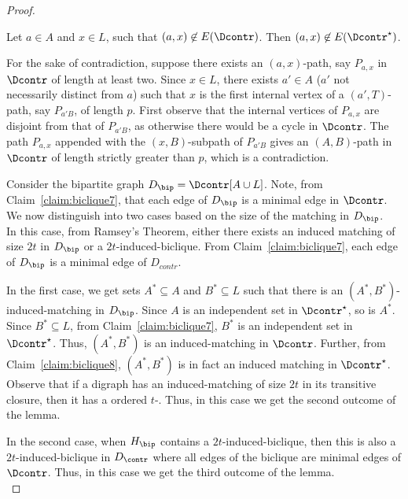 \begin{proof}
\begin{claim}\label{claim:biclique8}
Let $a \in A$ and $x \in L$, such that $(a,x) \not \in E(\Dcontr)$. Then $(a,x) \not \in E(\Dcontr^{\star})$.
\end{claim}

\begin{claimproof}
For the sake of contradiction, suppose there exists an $(a,x)$-path, say $P_{a,x}$ in $\Dcontr$ of length at least two. Since $x \in L$, there exists $a' \in A$ ($a'$ not necessarily distinct from $a$) such that $x$ is the first internal vertex of a $(a',T)$-path, say $P_{a'B}$, of length $p$. First observe that the internal vertices of $P_{a,x}$ are disjoint from that of $P_{a'B}$, as otherwise there would be a cycle in $\Dcontr$. The path $P_{a,x}$ appended with the $(x,B)$-subpath of $P_{a'B}$ gives an $(A,B)$-path in $\Dcontr$ of length strictly greater than $p$, which is a contradiction.
\end{claimproof}

Consider the bipartite graph $D_{\bip}=\Dcontr[A \cup L]$. Note, from Claim~\ref{claim:biclique7}, that each edge of $D_{\bip}$ is a minimal edge in $\Dcontr$.
We now distinguish into two cases based on the size of the matching in $D_{\bip}$.\\

 In this case, from Ramsey's Theorem, either there exists an induced matching of size $2t$ in $D_{\bip}$ or a $2t$-induced-biclique. From Claim~\ref{claim:biclique7}, each edge of $D_{\bip}$ is a minimal edge of $D_{contr}$. 

In the first case, we get sets $A^* \subseteq A$ and $B^* \subseteq L$ such that there is an $(A^*,B^*)$-induced-matching in $D_{\bip}$. Since $A$ is an independent set in $\Dcontr^{\star}$, so is $A^*$. Since $B^* \subseteq L$, from Claim~\ref{claim:biclique7}, $B^*$ is an independent set in $\Dcontr^{\star}$. Thus, $(A^*,B^*)$ is an induced-matching in $\Dcontr$. Further, from Claim~\ref{claim:biclique8}, $(A^*,B^*)$ is in fact an induced matching in $\Dcontr^{\star}$. Observe that if a digraph has an induced-matching of size $2t$ in its transitive closure, then it has a ordered $t$-\toughpair. Thus, in this case we get the second outcome of the lemma.

In the second case, when $H_{\bip}$ contains a $2t$-induced-biclique, then this is also a $2t$-induced-biclique in $D_{\contr}$ where all edges of the biclique are minimal edges of $\Dcontr$. Thus, in this case we get the third outcome of the lemma.\\


\end{proof}
